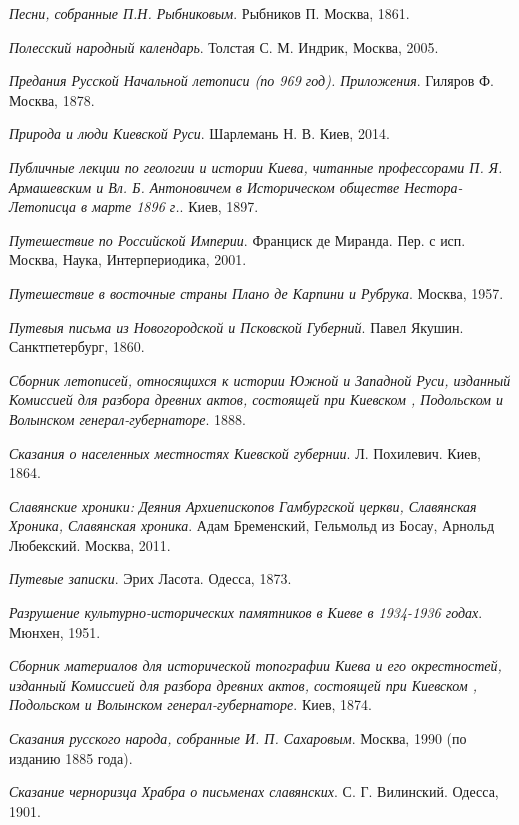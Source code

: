 \emph{Песни, собранные П.Н. Рыбниковым}. Рыбников П. Москва, 1861.

\emph{Полесский народный календарь}. Толстая С. М. Индрик, Москва, 2005.

\emph{Предания Русской Начальной летописи (по 969 год). Приложения}. Гиляров Ф. Москва, 1878.

\emph{Природа и люди Киевской Руси}. Шарлемань Н. В. Киев, 2014.

\emph{Публичные лекции по геологии и истории Киева, читанные профессорами П. Я. Армашевским и Вл. Б. Антоновичем в Историческом обществе Нестора-Летописца в марте 1896 г.}. Киев, 1897.

\emph{Путешествие по Российской Империи}. Франциск де Миранда. Пер. с исп. Москва, Наука, Интерпериодика, 2001.

\emph{Путешествие в восточные страны Плано де Карпини и Рубрука}. Москва, 1957.

\emph{Путевыя письма из Новогородской и Псковской Губерний}. Павел Якушин. Санктпетербург, 1860.

\emph{Сборник летописей, относящихся к истории Южной и Западной Руси, изданный Комиссией для разбора древних актов, состоящей при Киевском , Подольском и Волынском генерал-губернаторе}. 1888.

\emph{Сказания о населенных местностях Киевской губернии}. Л. Похилевич. Киев, 1864.

\emph{Славянские хроники: Деяния Архиепископов Гамбургской церкви, Славянская Хроника, Славянская хроника}. Адам Бременский, Гельмольд из Босау, Арнольд Любекский. Москва, 2011. 

\emph{Путевые записки}. Эрих Ласота. Одесса, 1873.

\emph{Разрушение культурно-исторических памятников в Киеве в 1934-1936 годах}. Мюнхен, 1951.

\emph{Сборник материалов для исторической топографии Киева и его окрестностей, изданный Комиссией для разбора древних актов, состоящей при Киевском , Подольском и Волынском генерал-губернаторе}. Киев, 1874.

\emph{Сказания русского народа, собранные И. П. Сахаровым}. Москва, 1990 (по изданию 1885 года).

\emph{Сказание черноризца Храбра о письменах славянских}. С. Г. Вилинский. Одесса, 1901.

